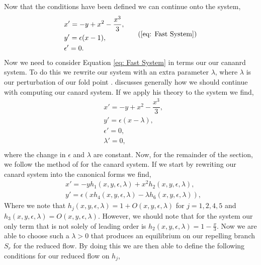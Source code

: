 Now that the conditions have been defined we can continue onto the \vdp system,
\begin{equation}
\begin{aligned}
&x'=-y+x^2-\dfrac{x^3}{3},\\
&y'=\epsilon(x-1),\\
&\epsilon'=0.\\
\end{aligned}
\tag{\ref{eq: Fast System}}
\end{equation}
Now we need to consider Equation \ref{eq: Fast System} in terms our our cananrd system. To do this we rewrite our system with an extra parameter $\lambda$, where $\lambda$ is our perturbation of our fold point \citep{krupa2001}. \citet{krupa2001} discusses generally how we should continue with computing our canard system. If we apply his theory to the \vdp system we find,
\begin{equation}
\begin{aligned}
&x'=-y+x^2-\dfrac{x^3}{3},\\
&y'=\epsilon(x-\lambda),\\
&\epsilon'=0,\\
&\lambda'=0,\\
\end{aligned}
\label{eq: canard system}
\end{equation}
where the change in $\epsilon$ and $\lambda$ are constant. Now, for the remainder of the section, we follow the method of \citet{krupa2001} for the canard system. If we start by rewriting our canard system into the canonical forms we find,
\begin{subequations}
	\begin{align}
		&x'=-yh_1(x,y,\epsilon,\lambda)+x^2h_2(x,y,\epsilon,\lambda),\\
		&y'=\epsilon(xh_4(x,y,\epsilon,\lambda)-\lambda h_6(x,y,\epsilon,\lambda)),
	\end{align}
\end{subequations}
Where we note that $h_j(x,y,\epsilon,\lambda)=1+O(x,y,\epsilon,\lambda)$ for $j=1,2,4,5$ and $h_3(x,y,\epsilon,\lambda)=O(x,y,\epsilon,\lambda)$. However, we should note that for the \vdp system our only term that is not solely of leading order is $h_2(x,y,\epsilon,\lambda)=1-\frac{x}{3}$. Now we are able to choose such a $\lambda>0$ that produces an equilibrium on our repelling branch $S_r$ for the reduced flow. By doing this we are then able to define the following conditions for our reduced flow on $h_j$,
